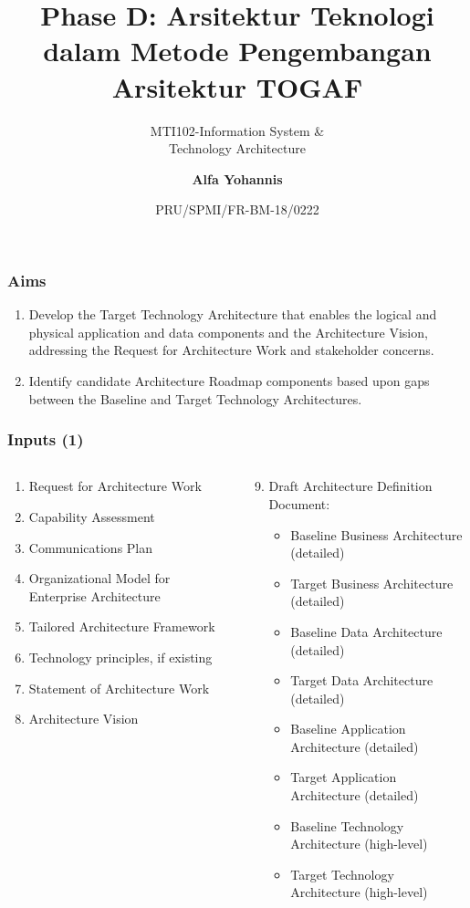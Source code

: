 \documentclass[aspectratio=169, table]{beamer}
\subtitle{MTI102-Information System \&\\Technology Architecture}
\title{\vskip-0.7cm Phase D: Arsitektur Teknologi\\dalam Metode Pengembangan\\Arsitektur TOGAF}
\date[Serial]{\scriptsize {PRU/SPMI/FR-BM-18/0222}}
\author[Pradita]{\small {\textbf{Alfa Yohannis}}}
\begin{document}
\frame{\titlepage}

\begin{frame}
\frametitle{Aims}
\begin{enumerate}
	\item Develop the Target Technology Architecture that enables the logical and physical application and data components and the Architecture Vision, addressing the Request for Architecture Work and stakeholder concerns.
	\item Identify candidate Architecture Roadmap components based upon gaps between the Baseline and Target Technology Architectures.
\end{enumerate}
\end{frame}

\begin{frame}
	\frametitle{Inputs (1)}
	\vspace{20pt}
	\begin{columns}[onlytextwidth]
		\begin{column}{0.45\textwidth}
			\begin{enumerate}
				\item Request for Architecture Work
				\item Capability Assessment
				\item Communications Plan
				\item Organizational Model for Enterprise Architecture
				\item Tailored Architecture Framework
				\item Technology principles, if existing
				\item Statement of Architecture Work
				\item Architecture Vision
			\end{enumerate}
		\end{column}
		\begin{column}{0.55\textwidth}
			\begin{enumerate}
				\setcounter{enumi}{8}
				\item Draft Architecture Definition Document:
				\begin{itemize}
					\item Baseline Business Architecture (detailed)
					\item Target Business Architecture (detailed)
					\item Baseline Data Architecture (detailed)
					\item Target Data Architecture (detailed)
					\item Baseline Application Architecture (detailed)
					\item Target Application Architecture (detailed)
					\item Baseline Technology Architecture (high-level)
					\item Target Technology Architecture (high-level)
				\end{itemize}
			\end{enumerate}
		\end{column}
	\end{columns}
\end{frame}
\end{document}
